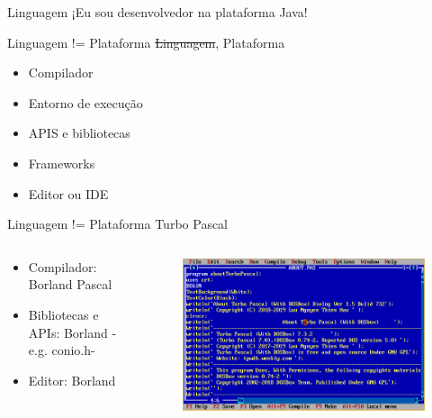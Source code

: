 \documentclass[aspectratio=169]{beamer}
\begin{document}
\begin{frame}{Linguagem}
    ¡Eu sou desenvolvedor na plataforma Java!
\end{frame}


\begin{frame}{Linguagem != Plataforma}
    \sout{Linguagem}, Plataforma
	\begin{itemize}
	\item Compilador
    \item Entorno de execução
    \item APIS e bibliotecas
    \item Frameworks
    \item Editor ou IDE
	\end{itemize}
\end{frame}

\begin{frame}{Linguagem != Plataforma}
    Turbo Pascal

    \begin{columns}[T] %
	     \begin{column}[T]{0.5\textwidth} %
            \begin{itemize}
                \item Compilador: Borland Pascal
                \item Bibliotecas e APIs: Borland -e.g. conio.h-
                \item Editor: Borland
            \end{itemize}
	     \end{column}
	     \begin{column}[T]{7cm} %
   			\begin{figure}
   			\centering
   			\includegraphics[width=\linewidth]{Images/pascal}
   			\end{figure}

	     \end{column}
     \end{columns}
\end{frame}
\end{document}
